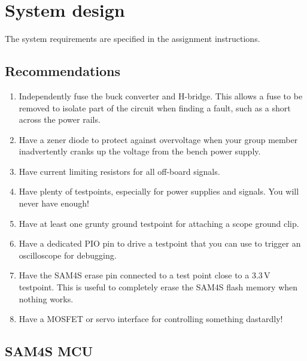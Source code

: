 \chapter{System design}
\label{hardware}

The system requirements are specified in the assignment instructions.


\section{Recommendations}\label{recommendations}

\begin{enumerate}
\item
  Independently fuse the buck converter and H-bridge. This allows a fuse
  to be removed to isolate part of the circuit when finding a fault,
  such as a short across the power rails.

\item
  Have a zener diode to protect against overvoltage when your group
  member inadvertently cranks up the voltage from the bench power
  supply.

\item
  Have current limiting resistors for all off-board signals.

\item
  Have plenty of testpoints, especially for power supplies and
  signals.  You will never have enough!

\item
  Have at least one grunty ground testpoint for attaching a scope ground
  clip.

\item
  Have a dedicated PIO pin to drive a testpoint that you can use to
  trigger an oscilloscope for debugging.

\item
  Have the SAM4S erase pin connected to a test point close to a 3.3\,V
  testpoint. This is useful to completely erase the SAM4S flash memory
  when nothing works.

\item
  Have a MOSFET or servo interface for controlling something dastardly!

\end{enumerate}

\section{SAM4S MCU}\label{sam4s-mcu}

